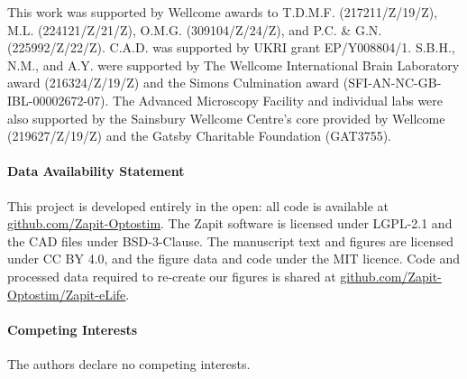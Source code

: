 \documentclass{preprint-raac}
\begin{document}
This work was supported by Wellcome awards to T.D.M.F. (217211/Z/19/Z), M.L. (224121/Z/21/Z), O.M.G. (309104/Z/24/Z), and P.C. \& G.N. (225992/Z/22/Z).
C.A.D. was supported by UKRI grant EP/Y008804/1.
S.B.H., N.M., and A.Y. were supported by The Wellcome International Brain Laboratory award (216324/Z/19/Z) and the Simons Culmination award (SFI-AN-NC-GB-IBL-00002672-07).
The Advanced Microscopy Facility and individual labs were also supported by the Sainsbury Wellcome Centre’s core provided by Wellcome (219627/Z/19/Z) and the Gatsby Charitable Foundation (GAT3755).

\paragraph*{Data Availability Statement}
This project is developed entirely in the open: all code is available at \href{https://github.com/Zapit-Optostim}{github.com/Zapit-Optostim}.
The Zapit software is licensed under LGPL-2.1 and the CAD files under BSD-3-Clause.
The manuscript text and figures are licensed under CC BY 4.0, and the figure data and code under the MIT licence.
Code and processed data required to re-create our figures is shared at \href{https://github.com/Zapit-Optostim/Zapit-eLife}{github.com/Zapit-Optostim/Zapit-eLife}.


\paragraph*{Competing Interests}
The authors declare no competing interests.

\clearpage
\printbibliography


\end{document}
